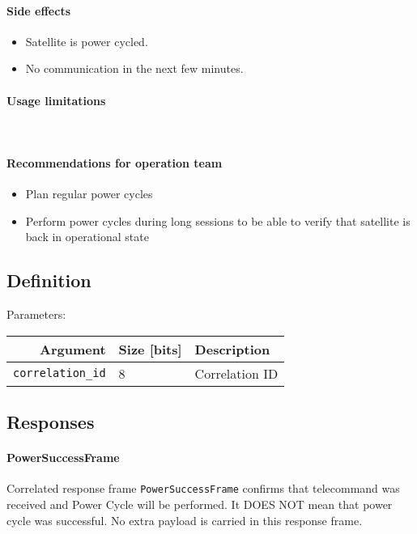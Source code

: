 \paragraph{Side effects}
\begin{itemize}
	\item Satellite is power cycled. 
	\item No communication in the next few minutes.
\end{itemize}

\paragraph{Usage limitations}\mbox{}\\ 
\None

\paragraph{Recommendations for operation team}
\begin{itemize}
	\item Plan regular power cycles
	\item Perform power cycles during long sessions to be able to verify that satellite is back in operational state
\end{itemize}


\subsection{Definition}

Parameters: 

\begin{tabular}{r | l | l}
	Argument                    & Size [bits] & Description \\
	\hline
	\texttt{correlation\_id}    & 8 		  &	Correlation ID \\
\end{tabular}


\subsection{Responses}

\paragraph{PowerSuccessFrame}
Correlated response frame \texttt{PowerSuccessFrame} confirms that telecommand was received and Power Cycle will be performed. It DOES NOT mean that power cycle was successful. No extra payload is carried in this response frame.

